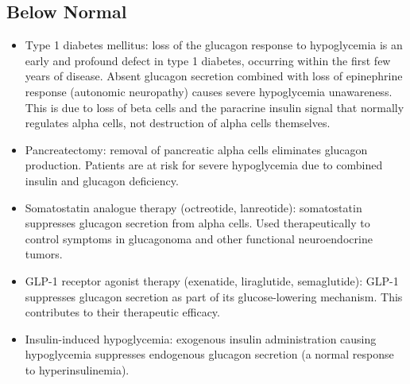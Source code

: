 \subsection*{Below Normal}
\begin{itemize}
  \item Type 1 diabetes mellitus: loss of the glucagon response to hypoglycemia is an early and profound defect in type 1 diabetes, occurring within the first few years of disease. Absent glucagon secretion combined with loss of epinephrine response (autonomic neuropathy) causes severe hypoglycemia unawareness. This is due to loss of beta cells and the paracrine insulin signal that normally regulates alpha cells, not destruction of alpha cells themselves.
  \item Pancreatectomy: removal of pancreatic alpha cells eliminates glucagon production. Patients are at risk for severe hypoglycemia due to combined insulin and glucagon deficiency.
  \item Somatostatin analogue therapy (octreotide, lanreotide): somatostatin suppresses glucagon secretion from alpha cells. Used therapeutically to control symptoms in glucagonoma and other functional neuroendocrine tumors.
  \item GLP-1 receptor agonist therapy (exenatide, liraglutide, semaglutide): GLP-1 suppresses glucagon secretion as part of its glucose-lowering mechanism. This contributes to their therapeutic efficacy.
  \item Insulin-induced hypoglycemia: exogenous insulin administration causing hypoglycemia suppresses endogenous glucagon secretion (a normal response to hyperinsulinemia).
\end{itemize}

